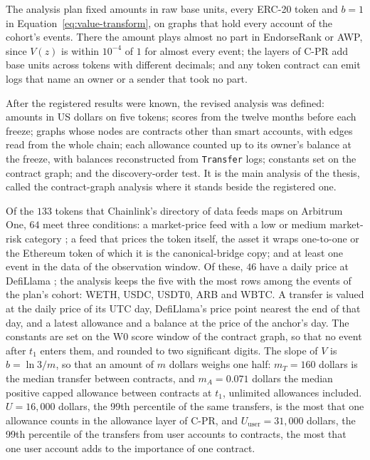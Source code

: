 The analysis plan fixed amounts in raw base units, every ERC-20 token and $b=1$ in Equation~\eqref{eq:value-transform}, on graphs that hold every account of the cohort's events. There the amount plays almost no part in EndorseRank or AWP, since $V(z)$ is within $10^{-4}$ of $1$ for almost every event; the layers of \mbox{C-PR} add base units across tokens with different decimals; and any token contract can emit logs that name an owner or a sender that took no part.

After the registered results were known, the revised analysis was defined: amounts in US dollars on five tokens; scores from the twelve months before each freeze; graphs whose nodes are contracts other than smart accounts, with edges read from the whole chain; each allowance counted up to its owner's balance at the freeze, with balances reconstructed from \texttt{Transfer} logs; constants set on the contract graph; and the discovery-order test. It is the main analysis of the thesis, called the contract-graph analysis where it stands beside the registered one.

Of the $133$ tokens that Chainlink's directory of data feeds maps on Arbitrum One, $64$ meet three conditions: a market-price feed with a low or medium market-risk category \parencite{chainlinknddatafeeds}; a feed that prices the token itself, the asset it wraps one-to-one or the Ethereum token of which it is the canonical-bridge copy; and at least one event in the data of the observation window. Of these, $46$ have a daily price at DefiLlama \parencite{defillamanddocs}; the analysis keeps the five with the most rows among the events of the plan's cohort: WETH, USDC, USDT0, ARB and WBTC. A transfer is valued at the daily price of its UTC day, DefiLlama's price point nearest the end of that day, and a latest allowance and a balance at the price of the anchor's day. The constants are set on the W0 score window of the contract graph, so that no event after $t_1$ enters them, and rounded to two significant digits. The slope of $V$ is $b=\ln 3/m$, so that an amount of $m$ dollars weighs one half: $m_T=160$ dollars is the median transfer between contracts, and $m_A=0.071$ dollars the median positive capped allowance between contracts at $t_1$, unlimited allowances included. $U=16{,}000$ dollars, the 99th percentile of the same transfers, is the most that one allowance counts in the allowance layer of \mbox{C-PR}, and $U_{\mathrm{user}}=31{,}000$ dollars, the 99th percentile of the transfers from user accounts to contracts, the most that one user account adds to the importance of one contract.

